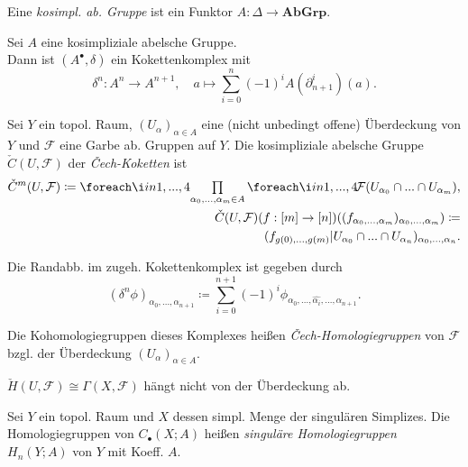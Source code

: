 \documentclass{cheat-sheet}
\newcommand{\nspace}[1]{\foreach \i in {1,...,#1}{ \! }} %
\newcommand{\AbGrp}{\mathbf{AbGrp}} %
\newcommand{\CC}[1]{{#1}_{\bullet}} %
\newcommand{\Fais}{\mathcal{F}} %
\begin{document}
\begin{defn}
  Eine \emph{kosimpl. ab. Gruppe} ist ein Funktor
  $A : \Delta \to \AbGrp$.
\end{defn}

\begin{defn}
  Sei $A$ eine kosimpliziale abelsche Gruppe. \\
  Dann ist $(A^\bullet, \delta)$ ein Kokettenkomplex mit
  \[
    \delta^n : A^n \to A^{n+1}, \quad
    a \mapsto \sum_{i=0}^n (-1)^i A(\partial_{n+1}^i)(a).
  \]
\end{defn}


\begin{defn}
  Sei $Y$ ein topol. Raum, $(U_\alpha)_{\alpha \in A}$ eine (nicht unbedingt offene) Überdeckung von $Y$ und $\Fais$ eine Garbe ab. Gruppen auf $Y$. Die kosimpliziale abelsche Gruppe $\check{C}(U, \Fais)$ der \emph{Čech-Koketten} ist
  \begin{align*}
    \check{C}^m(U, \Fais) \coloneqq \nspace{4} \prod_{\alpha_0,...,\alpha_m \in A} \nspace{4} \Fais(U_{\alpha_0} \cap ... \cap U_{\alpha_m}), \\
    \check{C}(U, \Fais)(f : [m] \to [n])((f_{\alpha_0,...,\alpha_m})_{\alpha_0,...,\alpha_m}) \coloneqq \\
    (f_{g(0),...,g(m)}|U_{\alpha_0} \cap ...\cap U_{\alpha_n})_{\alpha_0,...,\alpha_n}.
  \end{align*}
\end{defn}

\begin{bem}
  Die Randabb. im zugeh. Kokettenkomplex ist gegeben durch
  \[ (\delta^n \phi)_{\alpha_0,...,\alpha_{n+1}} \coloneqq \sum_{i=0}^{n+1} (-1)^i \phi_{\alpha_0,...,\hat{\alpha_i},...,\alpha_{n+1}}. \]
\end{bem}

\begin{defn}
  Die Kohomologiegruppen dieses Komplexes heißen \emph{Čech-Homologiegruppen} von $\Fais$ bzgl. der Überdeckung $(U_\alpha)_{\alpha \in A}$.
\end{defn}

\begin{bem}
  $\check{H}(U, \Fais) \cong \Gamma(X, \Fais)$ hängt nicht von der Überdeckung ab.
\end{bem}

\begin{defn}
  Sei $Y$ ein topol. Raum und $X$ dessen simpl. Menge der singulären Simplizes.
  Die Homologiegruppen von $\CC{C}(X; A)$ heißen \emph{singuläre Homologiegruppen} $H_n(Y; A)$ von $Y$ mit Koeff. $A$.
\end{defn}
\end{document}
